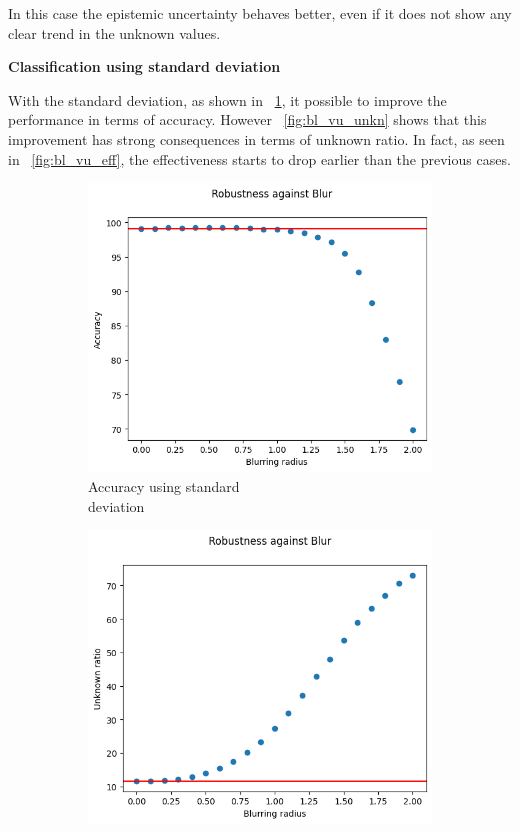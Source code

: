 In this case the epistemic uncertainty behaves better, even if it does not show any clear trend in the unknown values.

\vspace{0.3cm}
\textbf{Classification using standard deviation}
\vspace{0.1cm}

With the standard deviation, as shown in \Fig~\ref{fig:bl_vu_acc}, it possible to improve the performance in terms of accuracy. However \Fig~\ref{fig:bl_vu_unkn} shows that this improvement has strong consequences in terms of unknown ratio. In fact, as seen in \Fig~\ref{fig:bl_vu_eff}, the effectiveness starts to drop earlier than the previous cases.

\begin{figure}[h]
	\centering
	\begin{subfigure}{.33\textwidth}
		\centering
		\includegraphics[width=0.9\linewidth]{ImageFiles/EvalBNN/BL/VU/acc}
		\caption{Accuracy using standard \\ deviation}
		\label{fig:bl_vu_acc}
	\end{subfigure}%
	\begin{subfigure}{.33\textwidth}
		\centering
		\includegraphics[width=0.9\linewidth]{ImageFiles/EvalBNN/BL/VU/unkn}

\end{subfigure}
\end{figure}
